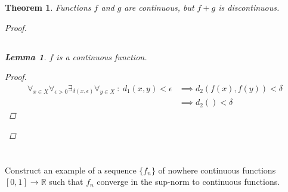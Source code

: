 \documentclass[]{article}
\newcommand{\R}{\mathbb{R}}
\newcommand{\st}{\ : \ }
\newtheorem{theorem}{Theorem}
\newtheorem{lemma}{Lemma}
\begin{document}
\begin{theorem}
    Functions $f$ and $g$ are continuous, but $f + g$ is discontinuous.
    \begin{proof}
        
        \subsection{}
        \begin{lemma}
            $f$ is a continuous function.
            \begin{proof}
                \begin{align*}
                    \forall_{x \in X} \forall_{\epsilon > 0} \exists_{\delta(x, \epsilon)} \forall_{y \in X} \st d_1(x,y) < \epsilon
                        &\implies d_2(f(x), f(y)) < \delta\\
                        &\implies d_2() < \delta
                \end{align*}
            \end{proof}
        \end{lemma}
    \end{proof}
\end{theorem}




\newpage
\section{}
Construct an example of a sequence $\{f_n\}$ of nowhere continuous functions $[0,1] \to \R$ such that $f_n$ converge in the sup-norm to continuous functions.
\end{document}
